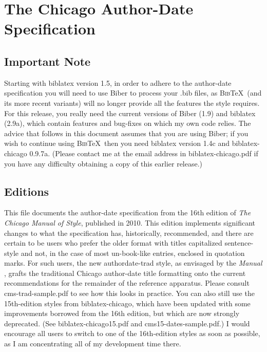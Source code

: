 \documentclass[a4paper,12pt]{report}
\begin{document}
\section*{The Chicago Author-Date Specification}
\label{sec:spec}

\subsection*{Important Note}
\label{bibernote}

Starting with \textsf{biblatex} version 1.5, in order to adhere to the
author-date specification you will need to use \textsf{Biber} to
process your .bib files, as \textsc{Bib}\TeX\ (and its more recent
variants) will no longer provide all the features the style requires.
For this release, you really need the current versions of
\textsf{Biber} (1.9) and \textsf{biblatex} (2.9a), which contain
features and bug-fixes on which my own code relies.  The advice that
follows in this document assumes that you are using \textsf{Biber}; if
you wish to continue using \textsc{Bib}\TeX\ then you need
\textsf{biblatex} version 1.4c and \textsf{biblatex-chicago} 0.9.7a.
(Please contact me at the email address in
\textsf{biblatex-chicago.pdf} if you have any difficulty obtaining a
copy of this earlier release.)

\subsection*{Editions}
\label{editions}

This file documents the author-date specification from the 16th
edition of \emph{The Chicago Manual of Style}, published in 2010.
This edition implements significant changes to what the specification
has, historically, recommended, and there are certain to be users who
prefer the older format with titles capitalized sentence-style and
not, in the case of most un-book-like entries, enclosed in quotation
marks.  For such users, the new \textsf{authordate-trad} style, as
envisaged by the \emph{Manual} \autocite*[15.45]{chicago:manual},
grafts the traditional Chicago author-date title formatting onto the
current recommendations for the remainder of the reference apparatus.
Please consult \textsf{cms-trad-sample.pdf} to see how this looks in
practice.  You can also still use the 15th-edition styles from
\textsf{biblatex-chicago}, which have been updated with some
improvements borrowed from the 16th edition, but which are now
strongly deprecated.  (See \textsf{biblatex-chicago15.pdf} and
\textsf{cms15-dates-sample.pdf}.)  I would encourage all users to
switch to one of the 16th-edition styles as soon as possible, as I am
concentrating all of my development time there.
\end{document}
